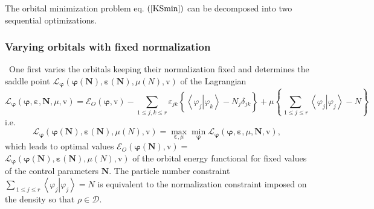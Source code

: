 \documentclass[aps,preprint]{revtex4}%
\begin{document}
The orbital minimization problem eq. $\left(  \ref{KSmin}\right)  $ can be
decomposed into two sequential optimizations.

\subsubsection{Varying orbitals with fixed normalization}

\ One first varies the orbitals keeping their normalization fixed and
determines the saddle point $\mathcal{L}_{\boldsymbol{\varphi}}\left(
\boldsymbol{\varphi}\left(  \boldsymbol{N}\right)  ,\boldsymbol{\varepsilon
}\left(  \boldsymbol{N}\right)  ,\mu\left(  N\right)  ,\mathrm{v}\right)  $ of
the Lagrangian
\begin{equation}
\mathcal{L}_{\boldsymbol{\varphi}}\left(  \boldsymbol{\varphi}%
,\boldsymbol{\varepsilon,N,}\mu\boldsymbol{,}\mathrm{v}\right)  =\mathcal{E}%
_{O}\left(  \boldsymbol{\varphi,}\mathrm{v}\right)  -\sum_{1\leq j,k\leq
r}\varepsilon_{jk}\left\{  \overset{\,}{\left\langle \left.  \varphi
_{j}\right\vert \varphi_{k}\right\rangle -N_{j}\delta_{jk}}\right\}
+\mu\left\{  \sum_{\,1\leq j\leq r}\left\langle \left.  \varphi_{j}\right\vert
\varphi_{j}\right\rangle -N\right\}  \label{OrbLag}%
\end{equation}
i.e.
\begin{equation}
\mathcal{L}_{\boldsymbol{\varphi}}\left(  \boldsymbol{\varphi}\left(
\boldsymbol{N}\right)  ,\boldsymbol{\varepsilon}\left(  \boldsymbol{N}\right)
,\mu\left(  N\right)  ,\mathrm{v}\right)  =\max_{\boldsymbol{\varepsilon,}\mu
}\min_{\boldsymbol{\varphi}}\mathcal{L}_{\boldsymbol{\varphi}}\left(
\boldsymbol{\varphi},\boldsymbol{\varepsilon},\mu\boldsymbol{,N,}%
\mathrm{v}\right)  , \label{KSM1}%
\end{equation}
which leads to optimal values $\mathcal{E}_{O}\left(  \boldsymbol{\varphi
}\left(  \boldsymbol{N}\right)  \boldsymbol{,}\mathrm{v}\right)  =$
$\mathcal{L}_{\boldsymbol{\varphi}}\left(  \boldsymbol{\varphi}\left(
\boldsymbol{N}\right)  ,\boldsymbol{\varepsilon}\left(  \boldsymbol{N}\right)
,\mu\left(  N\right)  \boldsymbol{,}\mathrm{v}\right)  $ of the orbital energy
functional for fixed values of the control parameters $\boldsymbol{N}$. The
particle number constraint $\sum_{\,1\leq j\leq r}\left\langle \left.
\varphi_{j}\right\vert \varphi_{j}\right\rangle =N$ is equivalent to the
normalization constraint imposed on the density so that $\rho\in\mathcal{D}$.
\end{document}
